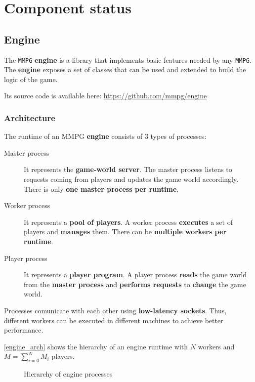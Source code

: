\documentclass[a4paper,11pt]{article}
\begin{document}
\section{Component status}
\label{components}
\subsection{Engine}
The \texttt{MMPG} \textbf{engine} is a library that implements basic features needed by any \texttt{MMPG}. The \textbf{engine} exposes a set
of classes that can be used and extended to build the logic of the game.

Its source code is available here: \url{https://github.com/mmpg/engine}
\subsubsection{Architecture}
The runtime of an \texttt{}MMPG\texttt{} \textbf{engine} consists of 3 types of processes:
\begin{description}
\item[Master process]
It represents the \textbf{game-world server}. The master process listens to requests coming from
players and updates the game world accordingly. There is only \textbf{one master process per runtime}.
\item[Worker process]
It represents a \textbf{pool of players}. A worker process \textbf{executes} a set of players and
  \textbf{manages} them. There can be \textbf{multiple workers per runtime}.
\item[Player process]
It represents a \textbf{player program}. A player process \textbf{reads} the game world from the
  \textbf{master process} and \textbf{performs requests} to \textbf{change} the game world.
\end{description}
Processes comunicate with each other using \textbf{low-latency sockets}. Thus, different workers can be executed
in different machines to achieve better performance.

\autoref{engine_arch} shows the hierarchy of an engine runtime with $N$ workers and $M = \sum_{i=0}^{N} M_i$ players.
\begin{figure}[!h]
\noindent\resizebox{\textwidth}{!}{

}
\caption{Hierarchy of engine processes}
\label{engine_arch}
\end{figure}
\end{document}
